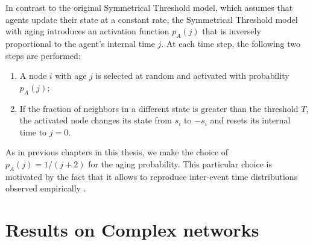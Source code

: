 In contrast to the original Symmetrical Threshold model, which assumes that agents update their state at a constant rate, the Symmetrical Threshold model with aging introduces an activation function $p_A (j)$ that is inversely proportional to the agent's internal time $j$. At each time step, the following two steps are performed:

\begin{enumerate}
    \item A node $i$ with age $j$ is selected at random and activated with probability $p_A(j)$;
    \item If the fraction of neighbors in a different state is greater than the threshold $T$, the activated node changes its state from $s_i$ to $-s_i$ and resets its internal time to $j=0$.
\end{enumerate}

As in previous chapters in this thesis, we make the choice of $p_A(j) = 1/(j+2)$ for the aging probability. This particular choice is motivated by the fact that it allows to reproduce inter-event time distributions observed empirically \cite{rybski-2009,artime-2017}. 

\section{\label{sec:Dynamics on networks} Results on Complex networks}

